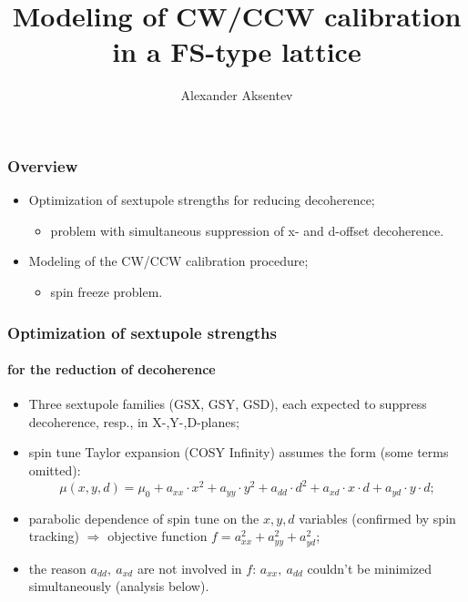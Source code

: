 \documentclass[pdf]{beamer}
\title{Modeling of CW/CCW calibration in a FS-type lattice}
\author{Alexander Aksentev}
\begin{document}
	\begin{frame}
		\titlepage
	\end{frame}
	\begin{frame}
		\frametitle{Overview}
		\begin{itemize}
			\item Optimization of sextupole strengths for reducing decoherence;
			\begin{itemize}
				\item problem with simultaneous suppression of x- and d-offset decoherence.
			\end{itemize}
			\item Modeling of the CW/CCW calibration procedure;
			\begin{itemize}
				\item spin freeze problem.
			\end{itemize}
		\end{itemize}
	\end{frame}
	\begin{frame}
		\frametitle{Optimization of sextupole strengths}
		\framesubtitle{for the reduction of decoherence}
		\begin{itemize}
			\item Three sextupole families (GSX, GSY, GSD), each expected to suppress decoherence, resp., in X-,Y-,D-planes;
			\item spin tune Taylor expansion (COSY Infinity) assumes the form (some terms omitted): 
			\[
				\mu(x,y,d) = \mu_0 + a_{xx}\cdot x^2 + a_{yy}\cdot y^2 + a_{dd}\cdot d^2 + a_{xd}\cdot x\cdot d + a_{yd}\cdot y\cdot d;
			\]
			\item parabolic dependence of spin tune on the $x,y,d$ variables (confirmed by spin tracking) $\Rightarrow$ objective function $f = a_{xx}^2 + a_{yy}^2 + a_{yd}^2$;
			\item the reason $a_{dd},~ a_{xd}$ are not involved in $f$: $a_{xx},~a_{dd}$ couldn't be minimized simultaneously (analysis below).
		\end{itemize}
	\end{frame}
\end{document}
